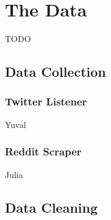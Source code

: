 \section{The Data}

TODO
\subsection{Data Collection}

\subsubsection{Twitter Listener}
Yuval

\subsubsection{Reddit Scraper}
Julia

\subsection{Data Cleaning}
\subsubsection{}
